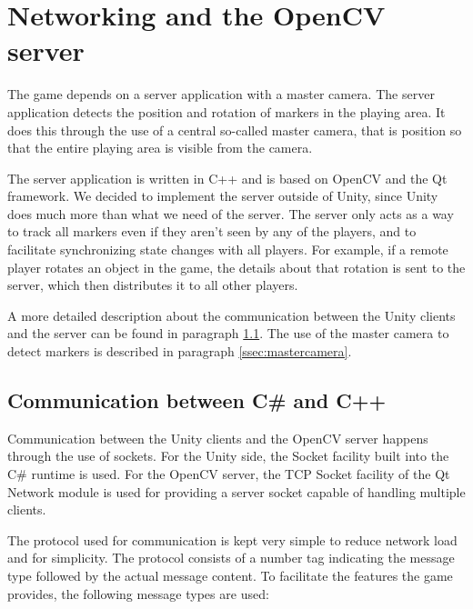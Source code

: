 	\section{Networking and the OpenCV server} \label{sec:network}
		The game depends on a server application with a master camera. The 
        server application detects the position and rotation of markers in the 
        playing area. It does this through the use of a central so-called master 
        camera, that is position so that the entire playing area is visible from 
        the camera.
        
        The server application is written in C++ and is based on OpenCV and the 
        Qt framework. We decided to implement the server outside of Unity, since 
        Unity does much more than what we need of the server. The server only 
        acts as a way to track all markers even if they aren't seen by any of 
        the players, and to facilitate synchronizing state changes with all 
        players. For example, if a remote player rotates an object in the game, 
        the details about that rotation is sent to the server, which then 
        distributes it to all other players.
        
        A more detailed description about the communication between the Unity 
        clients and the server can be found in paragraph \ref{ssec:communication}.
        The use of the master camera to detect markers is described in paragraph
        \ref{ssec:mastercamera}.
         		
		\subsection{Communication between C\# and C++} \label{ssec:communication}
			Communication between the Unity clients and the OpenCV server 
            happens through the use of sockets. For the Unity side, the Socket 
            facility built into the C\# runtime is used. For the OpenCV server, 
            the TCP Socket facility of the Qt Network module is used for 
            providing a server socket capable of handling multiple clients. 
            
            The protocol used for communication is kept very simple to reduce 
            network load and for simplicity. The protocol consists of a number
            tag indicating the message type followed by the actual message 
            content. To facilitate the features the game provides, the following
            message types are used:
            
